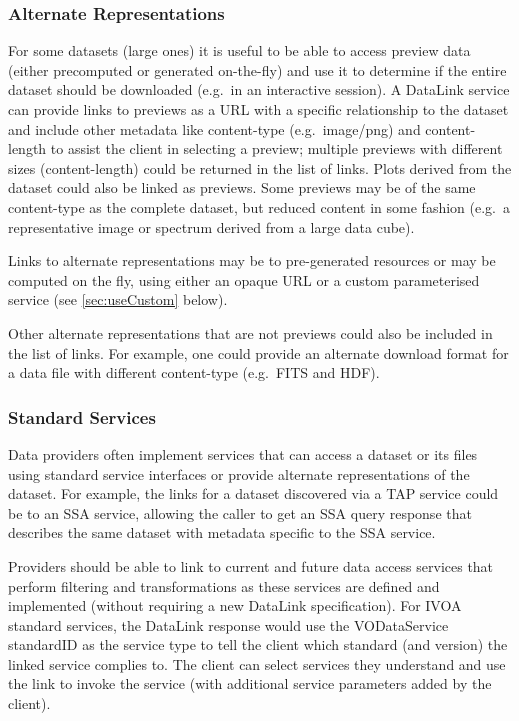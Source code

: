 \documentclass[11pt,a4paper]{ivoa}
\begin{document}
\subsubsection{Alternate Representations}

For some datasets (large ones) it is useful to be able to access
preview data (either precomputed or generated on-the-fly) and use it
to determine if the entire dataset should be downloaded (e.g.\ in an
interactive session). A DataLink service can provide links to previews
as a URL with a specific relationship to the dataset and include other
metadata like content-type (e.g.\ image/png) and content-length to assist
the client in selecting a preview; multiple previews with different sizes
(content-length) could be returned in the list of links. Plots derived
from the dataset could also be linked as previews. Some previews may be
of the same content-type as the complete dataset, but reduced content
in some fashion (e.g.\ a representative image or spectrum derived from
a large data cube).

Links to alternate representations may be to pre-generated resources
or may be computed on the fly, using either an opaque URL or a custom
parameterised service (see \ref{sec:useCustom} below).

Other alternate representations that are not previews could also
be included in the list of links. For example, one could provide an
alternate download format for a data file with different content-type
(e.g.\ FITS and HDF).


\subsubsection{Standard Services}
\label{sec:useStandard}

Data providers often implement services that can access a dataset
or its files using standard service interfaces or provide alternate
representations of the dataset. For example, the links for a dataset
discovered via a TAP service could be to an SSA service, allowing
the caller to get an SSA query response that describes the same dataset
with metadata specific to the SSA service.

Providers should be able to link to current and future data
access services that perform filtering and transformations as these
services are defined and implemented (without requiring a new DataLink
specification). For IVOA standard services, the DataLink response would
use the VODataService standardID as the service type to tell the client which
standard (and version) the linked service complies to. The client can
select services they understand and use the link to invoke the service
(with additional service parameters added by the client).
\end{document}
